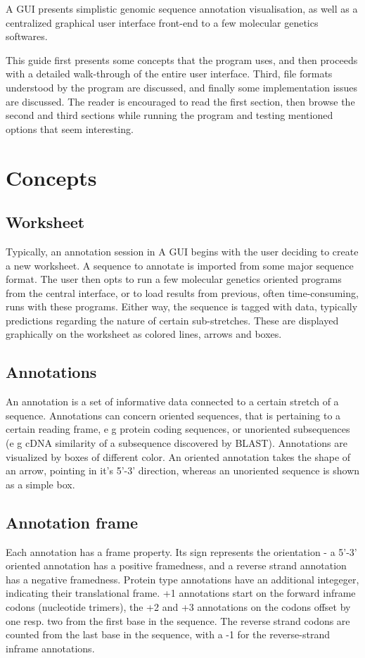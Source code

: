 
A GUI presents simplistic genomic sequence annotation visualisation,
as well as a centralized graphical user interface front-end to a few
molecular genetics softwares.

This guide first presents some concepts that the program uses, and then
proceeds with a detailed walk-through of the entire user
interface. Third, file formats understood by the program are
discussed, and finally some implementation issues are discussed. The
reader is encouraged to read the first section, then browse the second
and third sections while running the program and testing mentioned
options that seem interesting.


\section{Concepts}

\subsection{Worksheet}
Typically, an annotation session in A GUI begins with the user
deciding to create a new worksheet.  A sequence to annotate is
imported from some major sequence format. The user then opts to run a
few molecular genetics oriented programs from the central interface,
or to load results from previous, often time-consuming, runs with
these programs. Either way, the sequence is tagged with data,
typically predictions regarding the nature of certain sub-stretches.
These are displayed graphically on the worksheet as colored lines,
arrows and boxes.

\subsection{Annotations}
An annotation is a set of informative data connected to a certain
stretch of a sequence.  Annotations can concern oriented sequences,
that is pertaining to a certain reading frame, e g protein coding
sequences, or unoriented subsequences (e g cDNA similarity of a
subsequence discovered by BLAST).  Annotations are visualized by boxes
of different color. An oriented annotation takes the shape of an
arrow, pointing in it's 5'-3' direction, whereas an unoriented
sequence is shown as a simple box.

\subsection{Annotation frame}
Each annotation has a frame property. Its sign represents the
orientation - a 5'-3' oriented annotation has a positive framedness,
and a reverse strand annotation has a negative framedness. Protein
type annotations have an additional integeger, indicating their
translational frame. +1 annotations start on the forward inframe
codons (nucleotide trimers), the +2 and +3 annotations on the codons
offset by one resp. two from the first base in the sequence. The
reverse strand codons are counted from the last base in the sequence,
with a -1 for the reverse-strand inframe annotations.

